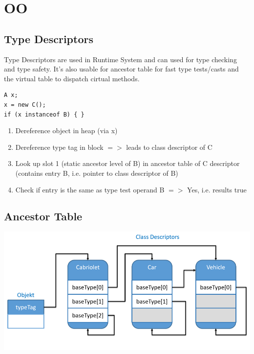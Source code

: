 \section{OO}
\subsection{Type Descriptors}
Type Descriptors are used in Runtime System and can used for type checking and type safety. It's also usable for ancestor table for fast type tests/casts and the virtual table to dispatch cirtual methods.

\begin{lstlisting}
A x;
x = new C();
if (x instanceof B) { }
\end{lstlisting}

\begin{enumerate}[nosep]
	\item Dereference object in heap (via x)
	\item  Dereference type tag in block $=>$ leads to class descriptor of C
	\item Look up slot 1 (static ancestor level of B) in ancestor table of C descriptor (contains entry B, i.e. pointer to class descriptor of B)
	\item Check if entry is the same as type test operand B $=>$ Yes, i.e. results true
\end{enumerate}

\subsection{Ancestor Table}
\begin{center}
	\includegraphics[width=\columnwidth]{"Images/ancestor table"}
\end{center}

